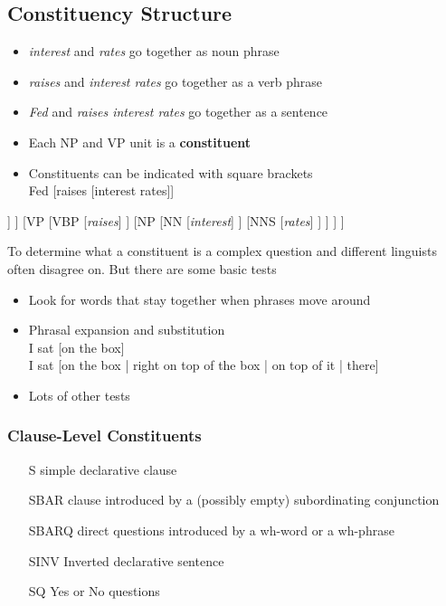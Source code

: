 \documentclass[11pt]{article}
\begin{document}
\subsection{Constituency Structure}
\begin{minipage}{0.6\linewidth}
	\begin{itemize}
		\item \emph{interest} and \emph{rates} go together as noun phrase
		\item \emph{raises} and \emph{interest rates} go together as a verb phrase
		\item \emph{Fed} and \emph{raises interest rates} go together as a sentence
		\item Each NP and VP unit is a \textbf{constituent}
		\item Constituents can be indicated with square brackets\\
		Fed [raises [interest rates]]
	\end{itemize}
\end{minipage}
\hspace{\fill}
\begin{minipage}{0.35\linewidth}
	\begin{forest}
		[S
			[NP
				[NNP
					[\emph{Fed}]
				]
			]
			[VP
				[VBP
					[\emph{raises}]
				]
				[NP
					[NN
						[\emph{interest}]
					]
					[NNS
						[\emph{rates}]
					]
				]
			]
		]
	\end{forest}
\end{minipage}
To determine what a constituent is a complex question and different linguists often disagree on. But there are some basic tests
\begin{itemize}[nosep]
	\item Look for words that stay together when phrases move around
	\item Phrasal expansion and substitution\\
	I sat [on the box]\\
	I sat [on the box | right on top of the box | on top of it | there]
	\item Lots of other tests
\end{itemize}

\subsubsection{Clause-Level Constituents}
\begin{itemize}[leftmargin=*, labelindent=1.5cm, labelsep=0.5cm, noitemsep]
	\item[S] simple declarative clause
	\item[SBAR] clause introduced by a (possibly empty) subordinating conjunction
	\item[SBARQ] direct questions introduced by a wh-word or a wh-phrase
	\item[SINV] Inverted declarative sentence
	\item[SQ] Yes or No questions
\end{itemize}
\end{document}
